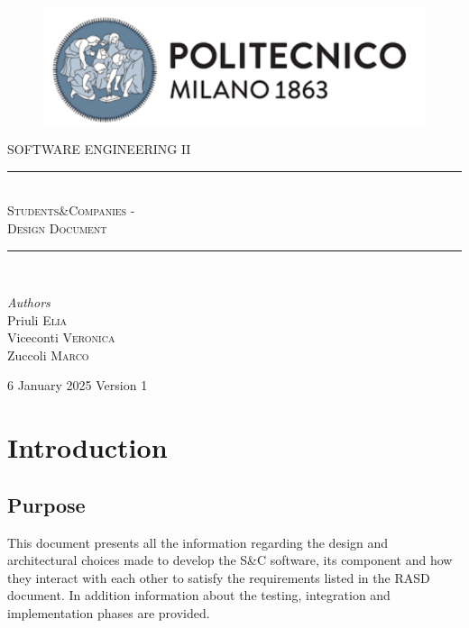 \documentclass{article}
\begin{document}
\begin{figure}[t]
    \includegraphics[scale=0.8]{logo_polimi.png}
    \centering
\end{figure}

\begin{titlepage}
    \newcommand{\HRule}{\rule{\linewidth}{0.5mm}}
    \center
	\textsc{\Large SOFTWARE ENGINEERING II}\\[0.5cm]
	
	\HRule\\[0.4cm]
	    {\huge \textsc{Students\&Companies - \\Design Document}}\\[0.4cm]
    \HRule\\[1.5cm]
	
	\begin{minipage}{1\textwidth}
		\begin{flushleft}
			\large
			\textit{Authors}\\
			Priuli \textsc{Elia}\\
			Viceconti \textsc{Veronica}\\
			Zuccoli \textsc{Marco}\\
		\end{flushleft} 
         \hspace*{\fill} 6 January 2025 \newline
         \hspace*{\fill} Version 1
	\end{minipage}
\end{titlepage}

\newpage
\tableofcontents
\newpage
\section{Introduction}
\subsection{Purpose}
This document presents all the information regarding the design and architectural choices made to develop the S\&C software, its component and how they interact with each other to satisfy the requirements listed in the RASD document.\newline
In addition information about the testing, integration and implementation phases are provided.
\end{document}
